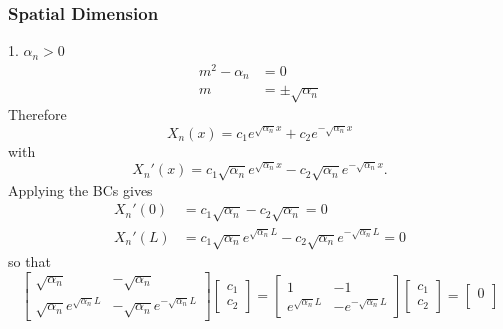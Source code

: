 \documentclass{article}
\begin{document}
\subsubsection{Spatial Dimension}
\begin{proofcase}{1. \(\alpha_n > 0\)}\let\qed\relax
    \begin{align*}
        m^2 - \alpha_n & = 0                     \\
        m              & = \pm \sqrt{ \alpha_n }
    \end{align*}
    Therefore
    \begin{equation*}
        X_n\left( x \right) = c_1 e^{\sqrt{ \alpha_n } x} + c_2 e^{-\sqrt{ \alpha_n } x}
    \end{equation*}
    with
    \begin{equation*}
        X_n'\left( x \right) = c_1 \sqrt{ \alpha_n } e^{\sqrt{ \alpha_n } x} - c_2 \sqrt{ \alpha_n } e^{-\sqrt{ \alpha_n } x}.
    \end{equation*}
    Applying the BCs gives
    \begin{align*}
        X_n'\left( 0 \right) & = c_1 \sqrt{\alpha_n} - c_2 \sqrt{\alpha_n} = 0                                              \\
        X_n'\left( L \right) & = c_1 \sqrt{\alpha_n} e^{\sqrt{\alpha_n} L} - c_2 \sqrt{\alpha_n} e^{-\sqrt{\alpha_n} L} = 0
    \end{align*}
    so that
    \begin{equation*}
        \begin{bmatrix*}
            \sqrt{\alpha_n} & -\sqrt{\alpha_n} \\
            \sqrt{\alpha_n} e^{\sqrt{\alpha_n} L} & -\sqrt{\alpha_n} e^{-\sqrt{\alpha_n} L}
        \end{bmatrix*}
        \begin{bmatrix*}
            c_1 \\
            c_2
        \end{bmatrix*}
        =
        \begin{bmatrix*}
            1 & -1 \\
            e^{\sqrt{\alpha_n} L} & -e^{-\sqrt{\alpha_n} L}
        \end{bmatrix*}
        \begin{bmatrix*}
            c_1 \\
            c_2
        \end{bmatrix*}
        =
        \begin{bmatrix*}
            0 \\

\end{bmatrix*}
\end{equation*}
\end{proofcase}
\end{document}
